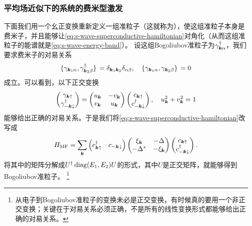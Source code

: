\subsubsection{平均场近似下的系统的费米型激发}

下面我们用一个幺正变换重新定义一组准粒子（这就称为），使这组准粒子本身是费米子，并且能够让\eqref{eq:s-wave-superconductive-hamiltonian}对角化（从而这组准粒子的能谱就是\eqref{eq:s-wave-energy-band}）。
设这组Bogoliubov准粒子为$\gamma^\dagger_{\vb*{k} \alpha}$，我们要求费米子的对易关系
\begin{equation}
    \acomm*{{\gamma}_{\vb*{k}_1 \alpha}}{{\gamma}^\dagger_{\vb*{k}_2 \beta}} = \delta_{\vb*{k}_1 \vb*{k}_2} \delta_{\alpha \beta}, \quad \acomm*{{\gamma}_{\vb*{k}_1 \alpha}}{{\gamma}_{\vb*{k}_2 \beta}} = 0
\end{equation}
成立。可以看到，以下正交变换
\begin{equation}
    \pmqty{{\gamma}_{\vb*{k} \uparrow} \\ {\gamma}^\dagger_{-\vb*{k} \downarrow}} = \pmqty{u_{\vb*{k}} & -v_{\vb*{k}} \\ v_{\vb*{k}} & u_{\vb*{k}}} \pmqty{{c}_{\vb*{k} \uparrow} \\ {c}^\dagger_{-\vb*{k} \downarrow}},
    \quad u_{\vb*{k}}^2 + v_{\vb*{k}}^2 = 1
\end{equation}
能够给出正确的对易关系。于是我们将\eqref{eq:s-wave-superconductive-hamiltonian}改写成
\begin{equation}
    H_\text{MF} = \sum_{\vb*{k}} \pmqty{c^\dagger_{\vb*{k} \uparrow} & c_{- \vb*{k} \downarrow}} \pmqty{ \xi_{\vb*{k}} & - \Delta \\ - \Delta^* & - \xi_{\vb*{k}} } \pmqty{c_{\vb*{k} \uparrow} \\ c^\dagger_{- \vb*{k} \downarrow}}.
    \label{eq:superconductivity-mf-matrix}
\end{equation}
将其中的矩阵分解成$U^\dagger \operatorname{diag}(E_1, E_2) U$的形式，其中$U$是正交矩阵，就能够得到Bogoliubov准粒子。%
\footnote{从电子到Bogoliubov准粒子的变换未必是正交变换，有时候真的要用一个非正交变换；关键在于对易关系必须正确，不是所有的线性变换形式都能够给出正确的对易关系。}%

